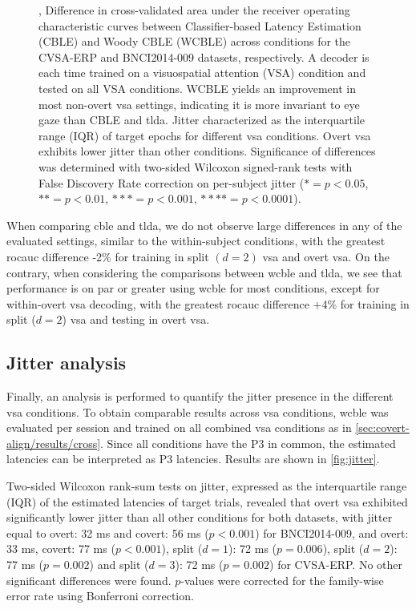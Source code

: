 \begin{figure}
  \caption[Cross-condition classifier performance and estimated jitter.]{
		,
    Difference in cross-validated area under the receiver
		operating characteristic curves between Classifier-based Latency Estimation
    (CBLE) and Woody CBLE (WCBLE) across conditions for the CVSA-ERP and
    BNCI2014-009 datasets, respectively.
    A decoder is each	time trained on a visuospatial attention (VSA) condition
    and tested on all VSA conditions.
    WCBLE yields an improvement in most
		non-overt \ac{vsa} settings, indicating it is more invariant to eye gaze than
    CBLE and \ac{tlda}.
		 Jitter characterized as the interquartile range (IQR)
		of target epochs for different \ac{vsa} conditions. Overt \ac{vsa} exhibits lower
    jitter than other conditions.
    Significance of differences
    was determined with two-sided Wilcoxon signed-rank tests with False Discovery
    Rate correction on per-subject jitter ($*= p<0.05$, $**=p<0.01$,
    $***=p<0.001$, $****=p<0.0001$).
	}
\end{figure}
When comparing \ac{cble} and \ac{tlda}, we do not observe large differences in any of the
evaluated settings, similar to the within-subject conditions, with the greatest
\ac{rocauc} difference -2\% for training in split $(d=2)$ \ac{vsa} and overt \ac{vsa}.
On the contrary, when considering the comparisons between \ac{wcble} and \ac{tlda}, we
see that performance is on par or greater using \ac{wcble} for most conditions,
except for within-overt \ac{vsa} decoding, with the greatest \ac{rocauc}
difference +4\% for training in split ($d=2$) \ac{vsa} and testing in overt
\ac{vsa}.


\subsection{Jitter analysis}
\label{sec:covert-align/results/jitter}
Finally, an analysis is performed to quantify the jitter presence in the
different \ac{vsa} conditions.
To obtain comparable results across \ac{vsa} conditions, \ac{wcble} was
evaluated per session and trained on all combined \ac{vsa} conditions as in
\cref{sec:covert-align/results/cross}.
Since all conditions have the P3 in common, the estimated latencies can be
interpreted as P3 latencies.
Results are shown in \cref{fig:jitter}.

Two-sided Wilcoxon rank-sum tests on jitter, expressed as the interquartile
range (IQR) of the estimated latencies of target trials, revealed that overt
\ac{vsa} exhibited significantly lower jitter than all other conditions for
both datasets, with jitter equal to overt: 32 ms and covert:
56 ms ($p<0.001$) for BNCI2014-009, and overt: 33 ms, covert: 77 ms ($p<0.001$),
split ($d=1$): 72 ms ($p=0.006$),
split ($d=2$): 77 ms ($p=0.002$)
and split ($d=3$): 72 ms ($p=0.002$)
for CVSA-ERP.
No other significant differences were found.
$p$-values were corrected for the family-wise error rate using Bonferroni
correction.

